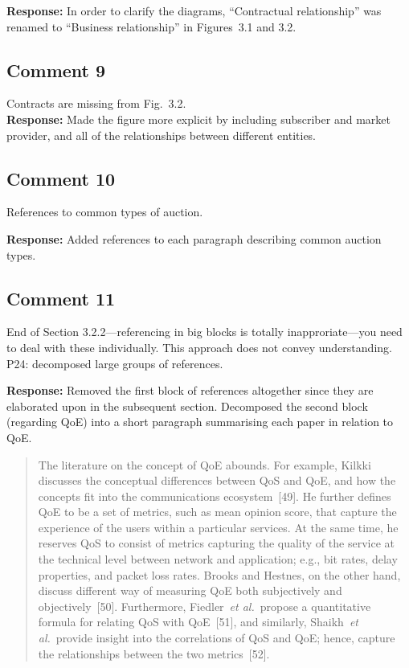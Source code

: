 \documentclass[10pt,a4paper,notitlepage]{article}
\numberwithin{equation}{section}
\begin{document}
\textbf{Response:}
In order to clarify the diagrams, ``Contractual relationship'' was renamed to ``Business relationship'' in Figures~3.1 and 3.2.

\subsection{Comment 9}
Contracts are missing from Fig.~3.2.\\[-2ex]

\textbf{Response:}
Made the figure more explicit by including subscriber and market provider, and all of the relationships between different entities.

\subsection{Comment 10}
References to common types of auction.

\textbf{Response:}
Added references to each paragraph describing common auction types.

\subsection{Comment 11}
End of Section 3.2.2---referencing in big blocks is totally inapproriate---you need to deal with these individually. This approach does not convey understanding. P24: decomposed large groups of references.

\textbf{Response:}
Removed the first block of references altogether since they are elaborated upon in the subsequent section. Decomposed the second block (regarding QoE) into a short paragraph summarising each paper in relation to QoE.
\begin{quote}
The literature on the concept of QoE abounds. For example, Kilkki discusses the conceptual differences between QoS and QoE, and how the concepts fit into the communications ecosystem~[49]. He further defines QoE to be a set of metrics, such as mean opinion score, that capture the experience of the users within a particular services. At the same time, he reserves QoS to consist of metrics capturing the quality of the service at the technical level between network and application; e.g., bit rates, delay properties, and packet loss rates. Brooks and Hestnes, on the other hand, discuss different way of measuring QoE both subjectively and objectively~[50]. Furthermore, Fiedler~\emph{et al.}~propose a quantitative formula for relating QoS with QoE~[51], and similarly, Shaikh~\emph{et al.}~provide insight into the correlations of QoS and QoE; hence, capture the relationships between the two metrics~[52].
\end{quote}
\end{document}
